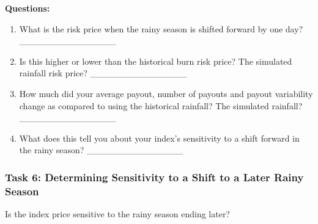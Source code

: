 \documentclass[letterpaper,10pt,english]{sphinxmanual}
\begin{document}
\textbf{Questions:}
\begin{enumerate}
\item {} 
What is the risk price when the rainy season is shifted forward by one day? \_\_\_\_\_\_\_\_\_\_\_\_\_\_\_

\item {} 
Is this higher or lower than the historical burn risk price? The simulated rainfall risk price? \_\_\_\_\_\_\_\_\_\_\_\_\_\_\_

\item {} 
How much did your average payout, number of payouts and payout variability change as compared to using the historical rainfall?  The simulated rainfall? \_\_\_\_\_\_\_\_\_\_\_\_\_\_\_

\item {} 
What does this tell you about your index's sensitivity to a shift forward in the rainy season? \_\_\_\_\_\_\_\_\_\_\_\_\_\_\_

\end{enumerate}


\subsubsection{Task 6: Determining Sensitivity to a Shift to a Later Rainy Season}
\label{wiiet/wiiet_initialtomarketpricing_Web:task-6-determining-sensitivity-to-a-shift-to-a-later-rainy-season}
Is the index price sensitive to the rainy season ending later?
\end{document}
